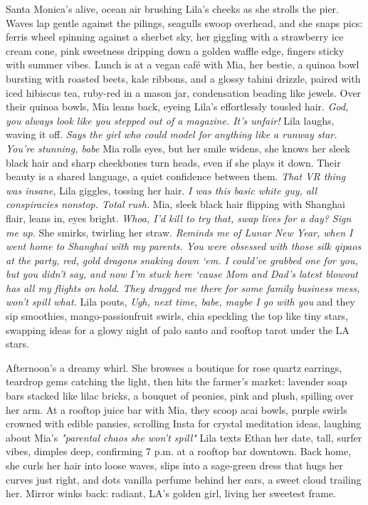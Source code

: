 \documentclass[12pt,oneside]{book}
\begin{document}
Santa Monica’s alive, ocean air brushing Lila’s cheeks as she strolls the pier. Waves lap gentle against the pilings, seagulls swoop overhead, and she snaps pics: ferris wheel spinning against a sherbet sky, her giggling with a strawberry ice cream cone, pink sweetness dripping down a golden waffle edge, fingers sticky with summer vibes. Lunch is at a vegan café with Mia, her bestie, a quinoa bowl bursting with roasted beets, kale ribbons, and a glossy tahini drizzle, paired with iced hibiscus tea, ruby-red in a mason jar, condensation beading like jewels. Over their quinoa bowls, Mia leans back, eyeing Lila’s effortlessly tousled hair. \textit{God, you always look like you stepped out of a magazine. It’s unfair!} Lila laughs, waving it off. \textit{Says the girl who could model for anything like a runway star. You’re stunning, babe} Mia rolls eyes, but her smile widens, she knows her sleek black hair and sharp cheekbones turn heads, even if she plays it down. Their beauty is a shared language, a quiet confidence between them. \textit{That VR thing was insane}, Lila giggles, tossing her hair. \textit{I was this basic white guy, all conspiracies nonstop. Total rush.} Mia, sleek black hair flipping with Shanghai flair, leans in, eyes bright. \textit{Whoa, I’d kill to try that, swap lives for a day? Sign me up.} She smirks, twirling her straw. \textit{Reminds me of Lunar New Year, when I went home to Shanghai with my parents. You were obsessed with those silk qipaos at the party, red, gold dragons snaking down ‘em. I could’ve grabbed one for you, but you didn’t say, and now I’m stuck here ‘cause Mom and Dad’s latest blowout has all my flights on hold. They dragged me there for some family business mess, won’t spill what.} Lila pouts, \textit{Ugh, next time, babe, maybe I go with you} and they sip smoothies, mango-passionfruit swirls, chia speckling the top like tiny stars, swapping ideas for a glowy night of palo santo and rooftop tarot under the LA stars.

Afternoon’s a dreamy whirl. She browses a boutique for rose quartz earrings, teardrop gems catching the light, then hits the farmer’s market: lavender soap bars stacked like lilac bricks, a bouquet of peonies, pink and plush, spilling over her arm. At a rooftop juice bar with Mia, they scoop acai bowls, purple swirls crowned with edible pansies, scrolling Insta for crystal meditation ideas, laughing about Mia’s \textit{"parental chaos she won’t spill"} Lila texts Ethan her date, tall, surfer vibes, dimples deep, confirming 7 p.m. at a rooftop bar downtown. Back home, she curls her hair into loose waves, slips into a sage-green dress that hugs her curves just right, and dots vanilla perfume behind her ears, a sweet cloud trailing her. Mirror winks back: radiant, LA’s golden girl, living her sweetest frame.
\end{document}

